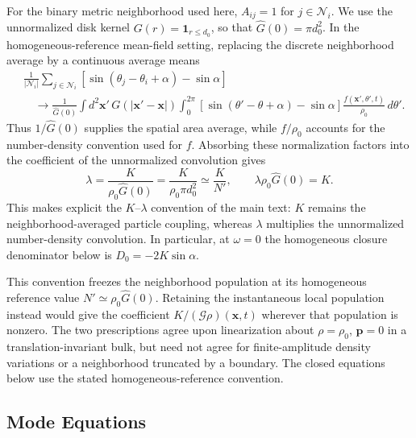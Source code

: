 \documentclass[11pt]{article}
\numberwithin{equation}{section}
\begin{document}
For the binary metric neighborhood used here, $A_{ij}=1$ for
$j\in\mathcal N_i$. We use the unnormalized disk kernel
$G(r)=\mathbf 1_{r\le d_0}$, so that
$\widehat G(0)=\pi d_0^2$. In the homogeneous-reference mean-field
setting, replacing the discrete neighborhood average by a continuous
average means
\begin{align}
 &\frac{1}{|\mathcal N_i|}\sum_{j\in\mathcal N_i}
 [\sin(\theta_j-\theta_i+\alpha)-\sin\alpha]
 \nonumber\\
 &\quad\longrightarrow
 \frac{1}{\widehat G(0)}
 \int d^2\mathbf x'\,G(|\mathbf x'-\mathbf x|)
 \int_0^{2\pi}
 [\sin(\theta'-\theta+\alpha)-\sin\alpha]
 \frac{f(\mathbf x',\theta',t)}{\rho_0}\,d\theta'.
 \label{eq:discrete_to_continuous_neighborhood_average}
\end{align}
Thus $1/\widehat G(0)$ supplies the spatial area average, while
$f/\rho_0$ accounts for the number-density convention used for $f$.
Absorbing these normalization factors into the coefficient of the
unnormalized convolution gives
\begin{equation}
 \boxed{\lambda=\frac{K}{\rho_0\widehat G(0)}
 =\frac{K}{\rho_0\pi d_0^2}\simeq\frac{K}{N'}},
 \qquad \lambda\rho_0\widehat G(0)=K .
 \label{eq:particle_continuum_coupling_normalization}
\end{equation}
This makes explicit the $K$--$\lambda$ convention of the main text:
$K$ remains the neighborhood-averaged particle coupling, whereas
$\lambda$ multiplies the unnormalized number-density convolution.
In particular, at $\omega=0$ the homogeneous closure denominator below
is $D_0=-2K\sin\alpha$.

This convention freezes the neighborhood population at its homogeneous
reference value $N'\simeq\rho_0\widehat G(0)$. Retaining the instantaneous
local population instead would give the coefficient
$K/(\mathcal G\rho)(\mathbf x,t)$ wherever that population is nonzero.
The two prescriptions agree upon linearization about
$\rho=\rho_0$, $\mathbf p=0$ in a translation-invariant bulk, but need
not agree for finite-amplitude density variations or a neighborhood
truncated by a boundary. The closed equations below use the stated
homogeneous-reference convention.

\subsection{Mode Equations}
\end{document}
